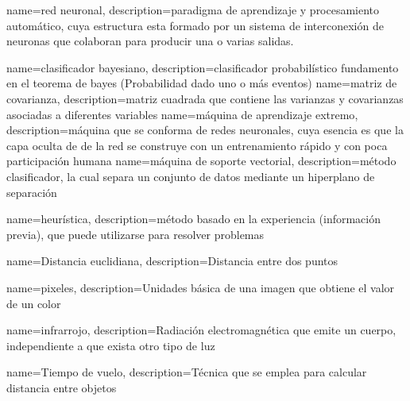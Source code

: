  {
 name={red neuronal},
 description={paradigma de aprendizaje y procesamiento autom\'atico, cuya estructura esta formado por un sistema de interconexi\'on de neuronas que colaboran para producir una o varias salidas.}
 }
 
 {
 name={clasificador bayesiano},
 description={clasificador probabil\'istico fundamento en el teorema de bayes (Probabilidad dado uno o m\'as eventos)}
 }
 {
 name={matriz de covarianza},
 description={matriz cuadrada que contiene las varianzas y covarianzas asociadas a diferentes variables}
 } 
 {
 name={m\'aquina de aprendizaje extremo},
 description={m\'aquina que se conforma de redes neuronales, cuya esencia es que la capa oculta de de la red se construye con un entrenamiento r\'apido y con poca participaci\'on humana}
 }  
 {
 name={m\'aquina de soporte vectorial},
 description={m\'etodo clasificador, la cual separa un conjunto de datos mediante un hiperplano de separaci\'on}
 }
 
 {
 name={heur\'istica},
 description={m\'etodo basado en la experiencia (informaci\'on previa), que puede utilizarse para resolver problemas }
 }


 
 {	
 name={Distancia euclidiana},
 description={Distancia entre dos puntos}
 }
 
 
 {
 name={pixeles},
 description={Unidades b\'asica de una imagen que obtiene el valor de un color}
 }
 
 {
 name={infrarrojo},
 description={Radiaci\'on electromagn\'etica que emite un cuerpo, independiente a que exista otro tipo de luz}
 }
 
 {
 name={Tiempo de vuelo},
 description={T\'ecnica que se emplea para calcular distancia entre objetos}
 }